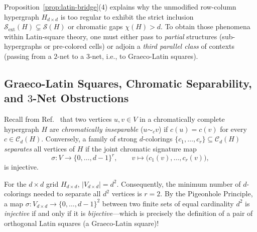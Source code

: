 \documentclass[aps,pra,reprint,superscriptaddress,longbibliography,nofootinbib,floatfix,10pt]{revtex4-2}
\theoremstyle{definition}\newtheorem{definition}[theorem]{Definition}
\theoremstyle{remark}\newtheorem{remark}[theorem]{Remark}
\newcommand{\Sc}{\mathcal S}\newcommand{\Cc}{\mathcal C}
\begin{document}
Proposition~\ref{prop:latin-bridge}(4) explains why the unmodified row-column hypergraph $H_{d\times d}$ is too regular to exhibit the strict inclusion $\Sc_{\mathrm{ext}}(H)\subsetneq\Sc(H)$ or chromatic gaps $\chi(H)>d$. To obtain those phenomena within Latin-square theory, one must either pass to \emph{partial} structures (sub-hypergraphs or pre-colored cells) or adjoin a \emph{third parallel class} of contexts (passing from a $2$-net to a $3$-net, i.e., to Graeco-Latin squares).

\subsection{Graeco-Latin Squares, Chromatic Separability, and \texorpdfstring{$3$}{3}-Net Obstructions}\label{sec:graeco-latin}

Recall from Ref.~\cite{svozil-2025-color} that two vertices $u,v\in V$ in a chromatically complete hypergraph $H$ are \emph{chromatically inseparable} ($u\sim_c v$) if $c(u)=c(v)$ for every $c\in\Cc_d(H)$. Conversely, a family of strong $d$-colorings $\{c_1,\ldots,c_r\}\subseteq\Cc_d(H)$ \emph{separates} all vertices of $H$ if the joint chromatic signature map
\begin{equation}\label{eq:signature-map}
\sigma:V\to\{0,\ldots,d-1\}^r,\qquad v\mapsto\bigl(c_1(v),\ldots,c_r(v)\bigr),
\end{equation}
is injective.

For the $d\times d$ grid $H_{d\times d}$, $|V_{d\times d}|=d^2$. Consequently, the minimum number of $d$-colorings needed to separate all $d^2$ vertices is $r=2$. By the Pigeonhole Principle, a map $\sigma:V_{d\times d}\to\{0,\ldots,d-1\}^2$ between two finite sets of equal cardinality $d^2$ is \emph{injective} if and only if it is \emph{bijective}—which is precisely the definition of a pair of orthogonal Latin squares (a Graeco-Latin square)!
\end{document}
